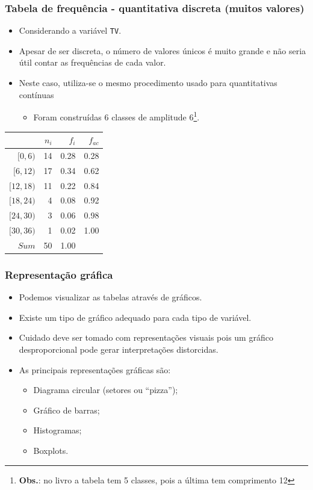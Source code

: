 \documentclass[11pt]{beamer}
\begin{document}
\begin{frame}
\frametitle{Tabela de frequência - quantitativa discreta (muitos
valores)}

\begin{itemize}
\item
  Considerando a variável \texttt{TV}.
\item
  Apesar de ser discreta, o número de valores únicos é muito grande e
  não seria útil contar as frequências de cada valor.
\item
  Neste caso, utiliza-se o mesmo procedimento usado para quantitativas
  contínuas

  \begin{itemize}
  \item
    Foram construídas 6 classes de amplitude 6\footnote{\textbf{Obs.}:
      no livro a tabela tem 5 classes, pois a última tem comprimento 12}.
  \end{itemize}
\end{itemize}

\begin{table}[ht]
\centering
\begin{tabular}{rrrr}
  \hline
 & $n_i$ & $f_i$ & $f_{ac}$ \\ 
  \hline
$[0,6)$ & 14 & 0.28 & 0.28 \\ 
  $[6,12)$ & 17 & 0.34 & 0.62 \\ 
  $[12,18)$ & 11 & 0.22 & 0.84 \\ 
  $[18,24)$ & 4 & 0.08 & 0.92 \\ 
  $[24,30)$ & 3 & 0.06 & 0.98 \\ 
  $[30,36)$ & 1 & 0.02 & 1.00 \\ 
   \hline
$Sum$ & 50 & 1.00 &  \\ 
   \hline
\end{tabular}
\end{table}
\end{frame}

\begin{frame}
\frametitle{Representação gráfica}

\begin{itemize}
\item
  Podemos visualizar as tabelas através de gráficos.
\item
  Existe um tipo de gráfico adequado para cada tipo de variável.
\item
  Cuidado deve ser tomado com representações visuais pois um gráfico
  desproporcional pode gerar interpretações distorcidas.
\item
  As principais representações gráficas são:

  \begin{itemize}
  \item
    Diagrama circular (setores ou ``pizza'');
  \item
    Gráfico de barras;
  \item
    Histogramas;
  \item
    Boxplots.
  \end{itemize}
\end{itemize}
\end{frame}
\end{document}
